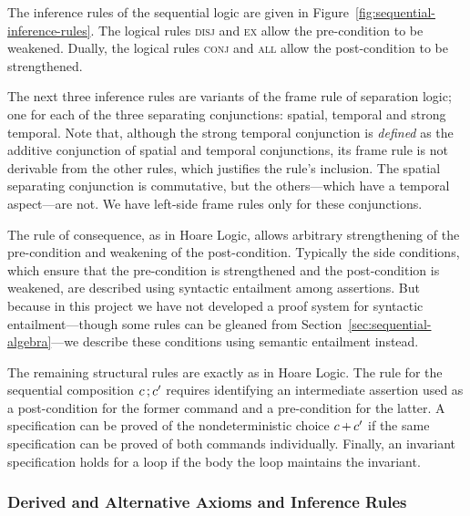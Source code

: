 \documentclass[11pt]{report}         %
\begin{document}
The inference rules of the sequential logic are given in Figure~\ref{fig:sequential-inference-rules}. The logical rules \textsc{disj} and \textsc{ex} allow the pre-condition to be weakened. Dually, the logical rules \textsc{conj} and \textsc{all} allow the post-condition to be strengthened. 

The next three inference rules are variants of the frame rule of separation logic; one for each of the three separating conjunctions: spatial, temporal and strong temporal. Note that, although the strong temporal conjunction is \emph{defined} as the additive conjunction of spatial and temporal conjunctions, its frame rule is not derivable from the other rules, which  justifies the rule's inclusion. The spatial separating conjunction is commutative, but the others---which have a temporal aspect---are not. We have left-side frame rules only for these conjunctions. 

The rule of consequence, as in Hoare Logic, allows arbitrary strengthening of the pre-condition and weakening of the post-condition. Typically the side conditions, which ensure that the pre-condition is strengthened and 
the post-condition is weakened, are described using syntactic entailment among assertions. But because in this project we have not developed a proof system for syntactic entailment---though some rules can be gleaned from Section~\ref{sec:sequential-algebra}---we describe these conditions using semantic entailment instead. 

The remaining structural rules are exactly as in Hoare Logic. The rule for the sequential composition $c \operatorname{;} c'$ requires identifying an intermediate assertion used as a post-condition for the former command and a pre-condition for the latter. A specification can be proved of the nondeterministic choice $c \operatorname{+} c'$ if the same specification can be proved of both commands individually. Finally, an invariant specification holds for a loop if the body the loop maintains the invariant. 

\subsubsection{Derived and Alternative Axioms and Inference Rules}
\end{document}
